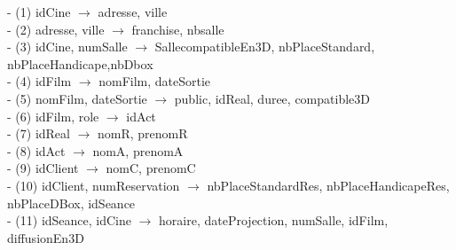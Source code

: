 \documentclass[a4paper,sffamily,12pt]{article}
\begin{document}
						\noindent- (1) idCine $\rightarrow$ adresse, ville \\
						- (2) adresse, ville $\rightarrow$ franchise, nbsalle \\
						- (3) idCine, numSalle $\rightarrow$ SallecompatibleEn3D, nbPlaceStandard, nbPlaceHandicape,nbDbox \\
				 		- (4) idFilm $\rightarrow$ nomFilm, dateSortie \\
						- (5) nomFilm, dateSortie $\rightarrow$ public, idReal, duree, compatible3D \\
						- (6) idFilm, role $\rightarrow$  idAct \\
						- (7) idReal $\rightarrow$ nomR, prenomR \\
						- (8) idAct $\rightarrow$ nomA, prenomA \\
						- (9) idClient $\rightarrow$ nomC, prenomC \\
						- (10) idClient, numReservation $\rightarrow$ nbPlaceStandardRes, nbPlaceHandicapeRes, nbPlaceDBox, idSeance \\
						- (11) idSeance, idCine $\rightarrow$ horaire, dateProjection, numSalle, idFilm, diffusionEn3D \\
															
\end{document}
